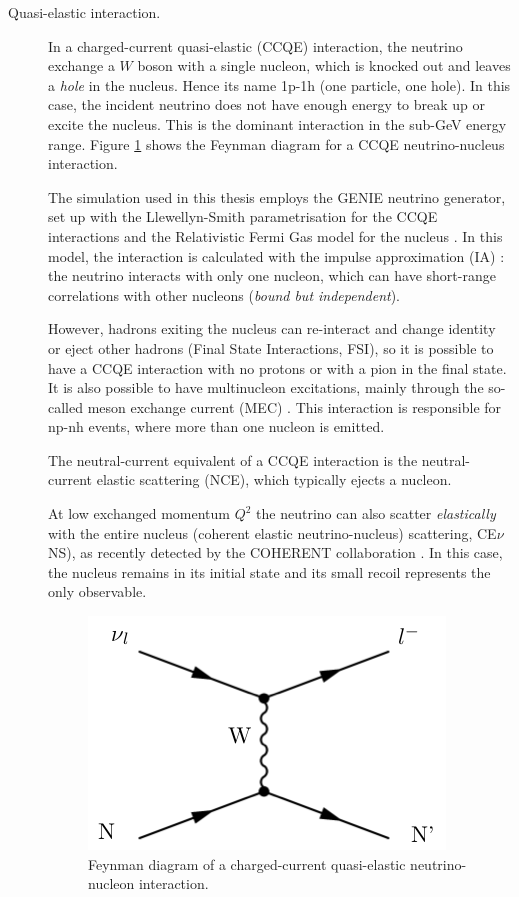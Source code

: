 \begin{description}
\item[Quasi-elastic interaction.] In a charged-current quasi-elastic (CCQE) interaction, the neutrino exchange a $W$ boson with a single nucleon, which is knocked out and leaves a \emph{hole} in the nucleus. Hence its name 1p-1h (one particle, one hole). In this case, the incident neutrino does not have enough energy to break up or excite the nucleus. This is the dominant interaction in the sub-GeV energy range. Figure \ref{fig:ccqe_feyn} shows the Feynman diagram for a CCQE neutrino-nucleus interaction.

The simulation used in this thesis employs the GENIE neutrino generator, set up with the Llewellyn-Smith parametrisation for the CCQE interactions \cite{LlewellynSmith:1971uhs} and the Relativistic Fermi Gas model for the nucleus \cite{Smith:1972xh}.
In this model, the interaction is calculated with the impulse approximation (IA) \cite{Benhar:2005dj}: the neutrino interacts with only one nucleon, which can have short-range correlations with other nucleons (\emph{bound but independent}).

However, hadrons exiting the nucleus can re-interact and change identity or eject other hadrons (Final State Interactions, FSI), so it is possible to have a CCQE interaction with no protons or with a pion in the final state. It is also possible to have multinucleon excitations, mainly through the so-called meson exchange current (MEC) \cite{Bodek:2011ps}. This interaction is responsible for np-nh events, where more than one nucleon is emitted.

The neutral-current equivalent of a CCQE interaction is the neutral-current elastic scattering (NCE), which typically ejects a nucleon.

At low exchanged momentum $Q^2$ the neutrino can also scatter \emph{elastically} with the entire nucleus (coherent elastic neutrino-nucleus) scattering, CE$\nu$NS), as recently detected by the COHERENT collaboration \cite{Akimov:2017ade}. In this case, the nucleus remains in its initial state and its small recoil represents the only observable.

\begin{figure}[htbp]
    \centering
    \includegraphics[width=0.65\linewidth]{figures/ccqe_feyn.png}
    \caption{Feynman diagram of a charged-current quasi-elastic neutrino-nucleon interaction.}
    \label{fig:ccqe_feyn}
\end{figure}


\end{description}
